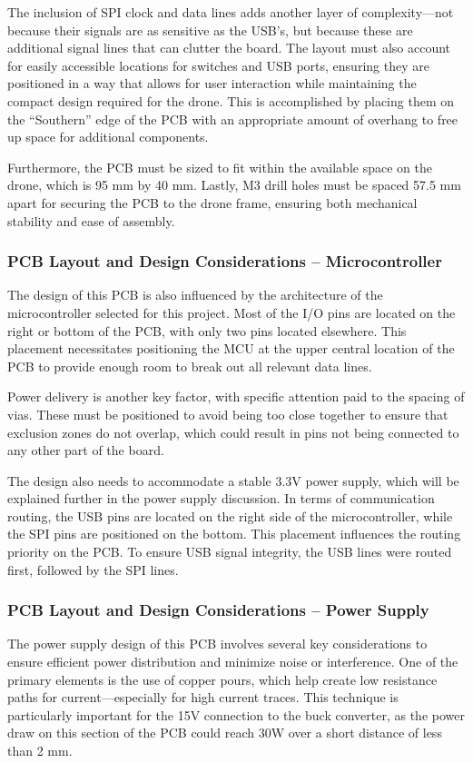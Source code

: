 \documentclass[12pt]{article}
\begin{document}
\par The inclusion of SPI clock and data lines adds another layer of complexity—not because their signals are as sensitive as the USB’s, but because these are additional signal lines that can clutter the board. The layout must also account for easily accessible locations for switches and USB ports, ensuring they are positioned in a way that allows for user interaction while maintaining the compact design required for the drone. This is accomplished by placing them on the ``Southern'' edge of the PCB with an appropriate amount of overhang to free up space for additional components.

\par Furthermore, the PCB must be sized to fit within the available space on the drone, which is 95 mm by 40 mm. Lastly, M3 drill holes must be spaced 57.5 mm apart for securing the PCB to the drone frame, ensuring both mechanical stability and ease of assembly.

\subsubsection{PCB Layout and Design Considerations – Microcontroller}
The design of this PCB is also influenced by the architecture of the microcontroller selected for this project. Most of the I/O pins are located on the right or bottom of the PCB, with only two pins located elsewhere. This placement necessitates positioning the MCU at the upper central location of the PCB to provide enough room to break out all relevant data lines.

\par Power delivery is another key factor, with specific attention paid to the spacing of vias. These must be positioned to avoid being too close together to ensure that exclusion zones do not overlap, which could result in pins not being connected to any other part of the board.

\par The design also needs to accommodate a stable 3.3V power supply, which will be explained further in the power supply discussion. In terms of communication routing, the USB pins are located on the right side of the microcontroller, while the SPI pins are positioned on the bottom. This placement influences the routing priority on the PCB. To ensure USB signal integrity, the USB lines were routed first, followed by the SPI lines.

\subsubsection{PCB Layout and Design Considerations – Power Supply}
The power supply design of this PCB involves several key considerations to ensure efficient power distribution and minimize noise or interference. One of the primary elements is the use of copper pours, which help create low resistance paths for current—especially for high current traces. This technique is particularly important for the 15V connection to the buck converter, as the power draw on this section of the PCB could reach 30W over a short distance of less than 2 mm.
\end{document}
